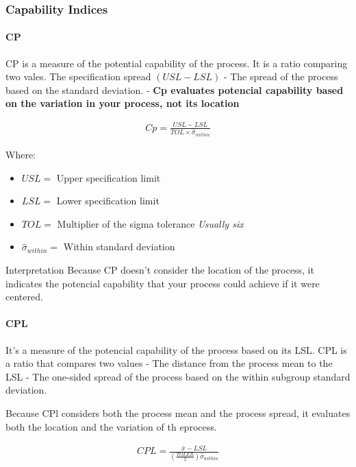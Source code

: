 \documentclass[11pt]{article}
\begin{document}
\hypertarget{capability-indices}{%
\subsubsection{Capability Indices}\label{capability-indices}}

\hypertarget{cp}{%
\paragraph{CP}\label{cp}}

CP is a measure of the potential capability of the process. It is a
ratio comparing two vales. The specification spread \((USL - LSL)\) - The
spread of the process based on the standard deviation. - \textbf{Cp
evaluates potencial capability based on the variation in your process,
not its location}

\begin{gather}
  Cp = \frac{USL - LSL}{TOL \times \hat{\sigma}_{within}}
\end{gather}

Where: 
\begin{itemize}
  \item \(USL =\) Upper specification limit
  \item \(LSL =\) Lower specification limit
  \item \(TOL =\) Multiplier of the sigma tolerance \emph{Usually six}
  \item \(\hat{\sigma}_{within} =\) Within  standard deviation
\end{itemize}

Interpretation Because CP doesn't consider the location of the process,
it indicates the potencial capability that your process could achieve if
it were centered.

\hypertarget{cpl}{%
\paragraph{CPL}\label{cpl}}

It's a measure of the potencial capability of the process based on its
LSL. CPL is a ratio that compares two values - The distance from the
process mean to the LSL - The one-sided spread of the process based on
the within subgroup standard deviation.

Because CPl considers both the process mean and the process spread, it
evaluates both the location and the variation of th eprocess.

\begin{gather}
  CPL = \frac{\bar{x} - LSL}{(\frac{TOLER}{2})\hat{\sigma}_{within}}
\end{gather}
\end{document}
